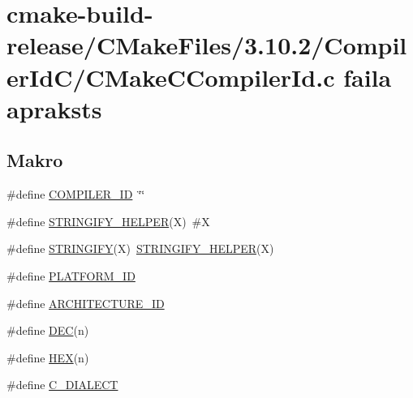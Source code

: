 \hypertarget{cmake-build-release_2_c_make_files_23_810_82_2_compiler_id_c_2_c_make_c_compiler_id_8c}{}\section{cmake-\/build-\/release/\+C\+Make\+Files/3.10.2/\+Compiler\+Id\+C/\+C\+Make\+C\+Compiler\+Id.c faila apraksts}
\label{cmake-build-release_2_c_make_files_23_810_82_2_compiler_id_c_2_c_make_c_compiler_id_8c}
\subsection*{Makro}
\begin{DoxyCompactItemize}
\item 
\#define \hyperlink{cmake-build-release_2_c_make_files_23_810_82_2_compiler_id_c_2_c_make_c_compiler_id_8c_a81dee0709ded976b2e0319239f72d174}{C\+O\+M\+P\+I\+L\+E\+R\+\_\+\+ID}~\char`\"{}\char`\"{}
\item 
\#define \hyperlink{cmake-build-release_2_c_make_files_23_810_82_2_compiler_id_c_2_c_make_c_compiler_id_8c_a2ae9b72bb13abaabfcf2ee0ba7d3fa1d}{S\+T\+R\+I\+N\+G\+I\+F\+Y\+\_\+\+H\+E\+L\+P\+ER}(X)~\#X
\item 
\#define \hyperlink{cmake-build-release_2_c_make_files_23_810_82_2_compiler_id_c_2_c_make_c_compiler_id_8c_a43e1cad902b6477bec893cb6430bd6c8}{S\+T\+R\+I\+N\+G\+I\+FY}(X)~\hyperlink{cmake-build-release_2_c_make_files_23_810_82_2_compiler_id_c_x_x_2_c_make_c_x_x_compiler_id_8cpp_a2ae9b72bb13abaabfcf2ee0ba7d3fa1d}{S\+T\+R\+I\+N\+G\+I\+F\+Y\+\_\+\+H\+E\+L\+P\+ER}(X)
\item 
\#define \hyperlink{cmake-build-release_2_c_make_files_23_810_82_2_compiler_id_c_2_c_make_c_compiler_id_8c_adbc5372f40838899018fadbc89bd588b}{P\+L\+A\+T\+F\+O\+R\+M\+\_\+\+ID}
\item 
\#define \hyperlink{cmake-build-release_2_c_make_files_23_810_82_2_compiler_id_c_2_c_make_c_compiler_id_8c_aba35d0d200deaeb06aee95ca297acb28}{A\+R\+C\+H\+I\+T\+E\+C\+T\+U\+R\+E\+\_\+\+ID}
\item 
\#define \hyperlink{cmake-build-release_2_c_make_files_23_810_82_2_compiler_id_c_2_c_make_c_compiler_id_8c_ad1280362da42492bbc11aa78cbf776ad}{D\+EC}(n)
\item 
\#define \hyperlink{cmake-build-release_2_c_make_files_23_810_82_2_compiler_id_c_2_c_make_c_compiler_id_8c_a46d5d95daa1bef867bd0179594310ed5}{H\+EX}(n)
\item 
\#define \hyperlink{cmake-build-release_2_c_make_files_23_810_82_2_compiler_id_c_2_c_make_c_compiler_id_8c_a07f8e5783674099cd7f5110e22a78cdb}{C\+\_\+\+D\+I\+A\+L\+E\+CT}
\end{DoxyCompactItemize}
